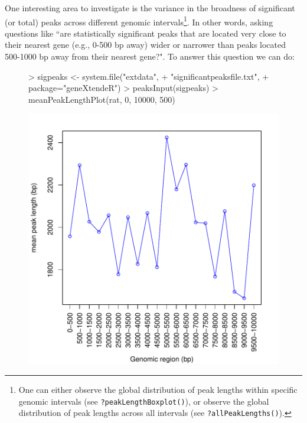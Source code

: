 \documentclass[12pt]{article}
\begin{document}
One interesting area to investigate is the variance in the broadness of significant (or total) peaks across different genomic intervals\footnote{One can either observe the global distribution of peak lengths within specific genomic intervals (see \texttt{?peakLengthBoxplot()}), or observe the global distribution of peak lengths across all intervals (see \texttt{?allPeakLengths()}).}.  In other words, asking questions like ``are statistically significant peaks that are located very close to their nearest gene (e.g., 0-500 bp away) wider or narrower than peaks located 500-1000 bp away from their nearest gene?".  To answer this question we can do:

\begin{figure}[H]
\begin{center}
\begin{Schunk}
\begin{Sinput}
> sigpeaks <- system.file("extdata", 
+                         "significantpeaksfile.txt",
+                         package="geneXtendeR")
> peaksInput(sigpeaks)
> meanPeakLengthPlot(rat, 0, 10000, 500)
\end{Sinput}
\end{Schunk}
\includegraphics{geneXtendeR-020}
\end{center}
\end{figure}
\end{document}
